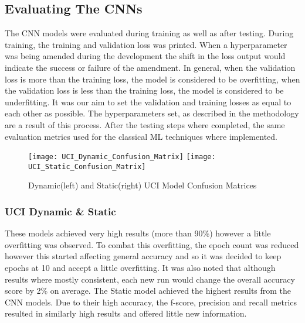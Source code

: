 \subsection{Evaluating The CNNs}
The CNN models were evaluated during training as well as after testing.
During training, the training and validation loss was printed.
When a hyperparameter was being amended during the development the shift in the loss output would indicate the success or failure of the amendment.
In general, when the validation loss is more than the training loss, the model is considered to be overfitting, when the validation loss is less than the training loss, the model is considered to be underfitting.
It was our aim to set the validation and training losses as equal to each other as possible.
The hyperparameters set, as described in the methodology are a result of this process.
After the testing steps where completed, the same evaluation metrics used for the classical ML techniques where implemented.

\begin{figure}[h]
\centering
\texttt{[image: UCI\_Dynamic\_Confusion\_Matrix]}\hfill
\texttt{[image: UCI\_Static\_Confusion\_Matrix]}\hfill
\caption*{Dynamic(left) and Static(right) UCI Model Confusion Matrices}
\label{UCI_Confusions}
\end{figure}

\subsubsection{UCI Dynamic \& Static}
These models achieved very high results (more than 90\%) however a little overfitting was observed.
To combat this overfitting, the epoch count was reduced however this started affecting general accuracy and so it was decided to keep epochs at 10 and accept a little overfitting.
It was also noted that although results where mostly consistent, each new run would change the overall accuracy score by 2\% on average.
The Static model achieved the highest results from the CNN models.
Due to their high accuracy, the f-score, precision and recall metrics resulted in similarly high results and offered little new information.


